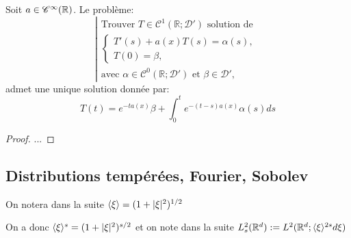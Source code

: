 \documentclass[french,a4paper,10pt]{article}
\begin{document}
            \begin{corollaire}\label{corol:2.2.11}
                Soit $a \in \mathscr{C}^{\infty}(\mathbb{R})$. Le problème:
                \begin{equation*}
                    \left| 
                    \begin{array}{l}
                        \text{Trouver } T \in \mathscr{C}^1(\mathbb{R}; \mathscr{D}') \text{ solution de } \\
                        \begin{cases}
                            T'(s) + a(x)T(s) = \alpha(s), \\
                            T(0) = \beta,
                        \end{cases} \\[10pt]
                        \text{avec } \alpha \in \mathscr{C}^0(\mathbb{R}; \mathscr{D}') \text{ et } \beta \in \mathscr{D}',
                    \end{array}
                    \right.
                \end{equation*}
                admet une unique solution donnée par: 
                \begin{equation*}
                    T(t) = e^{-ta(x)}\beta + \int_0^t e^{-(t-s)a(x)} \alpha(s)ds
                \end{equation*}
            \end{corollaire}

            \begin{proof}
                ...
            \end{proof}

        \newpage
        \subsection{Distributions tempérées, Fourier, Sobolev}\label{subsec:3}
            On notera dans la suite $\langle\xi\rangle = (1+\mathopen{}\left|\xi\right|\mathclose{}^2)^{1/2}$

            On a donc $\langle\xi\rangle^s = (1+\mathopen{}\left|\xi\right|\mathclose{}^2)^{s/2}$ et on note dans la suite $L_s^2(\mathbb{R}^d) := L^2(\mathbb{R}^d;\langle\xi\rangle^{2s}d\xi)$
\end{document}
